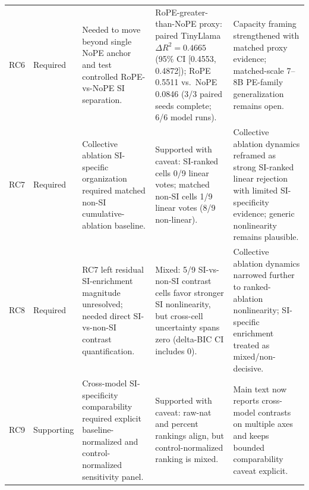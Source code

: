 \documentclass{article}
\begin{document}
\begin{table}[htbp]
\begin{tabular}{p{1.1cm}p{1.5cm}p{3.4cm}p{3.7cm}p{2.5cm}}
RC6 & Required & Needed to move beyond single NoPE anchor and test controlled RoPE-vs-NoPE SI separation. & RoPE-greater-than-NoPE proxy: paired TinyLlama $\Delta R^2=0.4665$ (95\% CI [0.4553, 0.4872]); RoPE 0.5511 vs.\ NoPE 0.0846 (3/3 paired seeds complete; 6/6 model runs). & Capacity framing strengthened with matched proxy evidence; matched-scale 7--8B PE-family generalization remains open. \\

RC7 & Required & Collective ablation SI-specific organization required matched non-SI cumulative-ablation baseline. & Supported with caveat: SI-ranked cells 0/9 linear votes; matched non-SI cells 1/9 linear votes (8/9 non-linear). & Collective ablation dynamics reframed as strong SI-ranked linear rejection with limited SI-specificity evidence; generic nonlinearity remains plausible. \\

RC8 & Required & RC7 left residual SI-enrichment magnitude unresolved; needed direct SI-vs-non-SI contrast quantification. & Mixed: 5/9 SI-vs-non-SI contrast cells favor stronger SI nonlinearity, but cross-cell uncertainty spans zero (delta-BIC CI includes 0). & Collective ablation dynamics narrowed further to ranked-ablation nonlinearity; SI-specific enrichment treated as mixed/non-decisive. \\

RC9 & Supporting & Cross-model SI-specificity comparability required explicit baseline-normalized and control-normalized sensitivity panel. & Supported with caveat: raw-nat and percent rankings align, but control-normalized ranking is mixed. & Main text now reports cross-model contrasts on multiple axes and keeps bounded comparability caveat explicit. \\

\bottomrule
\end{tabular}
\end{table}
\end{document}
